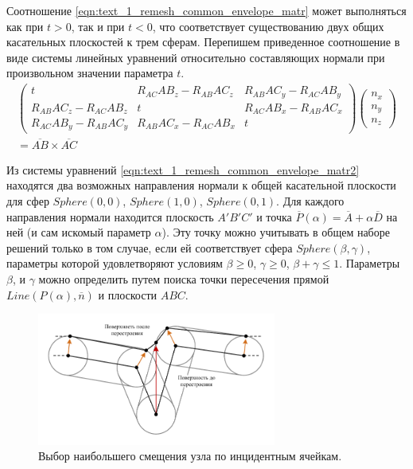 Соотношение \eqref{eqn:text_1_remesh_common_envelope_matr} может выполняться как при $t > 0$, так и при $t < 0$, что соответствует существованию двух общих касательных плоскостей к трем сферам.
Перепишем приведенное соотношение в виде системы линейных уравнений относительно составляющих нормали при произвольном значении параметра $t$.
\begin{multline}\label{eqn:text_1_remesh_common_envelope_matr2}
	\begin{pmatrix}
		t                         & R_{AC} AB_z - R_{AB} AC_z & R_{AB} AC_y - R_{AC} AB_y \\
		R_{AB} AC_z - R_{AC} AB_z & t                         & R_{AC} AB_x - R_{AB} AC_x \\
		R_{AC} AB_y - R_{AB} AC_y & R_{AB} AC_x - R_{AC} AB_x & t
	\end{pmatrix}
	\begin{pmatrix}
		n_x \\
		n_y \\
		n_z
	\end{pmatrix} \\
	= \overline{AB} \times \overline{AC}
\end{multline}

Из системы уравнений \eqref{eqn:text_1_remesh_common_envelope_matr2} находятся два возможных направления нормали к общей касательной плоскости для сфер $Sphere(0,0)$, $Sphere(1,0)$, $Sphere(0,1)$.
Для каждого направления нормали находится плоскость $A'B'C'$ и точка $\overline{P}(\alpha) = \overline{A} + \alpha \overline{D}$ на ней (и сам искомый параметр $\alpha$).
Эту точку можно учитывать в общем наборе решений только в том случае, если ей соответствует сфера $Sphere(\beta, \gamma)$, параметры которой удовлетворяют условиям $\beta \ge 0$, $\gamma \ge 0$, $\beta + \gamma \le 1$.
Параметры $\beta$, и $\gamma$ можно определить путем поиска точки пересечения прямой $Line(P(\alpha), \overline{n})$ и плоскости $ABC$.

\begin{figure}[ht]
\centering
\includegraphics[width=0.7\textwidth]{fig/3dr_out_from_cave.pdf}
\singlespacing
{}\caption{Выбор наибольшего смещения узла по инцидентным ячейкам.}
\label{fig:text_1_remesh_common_envelope_4}
\end{figure}

